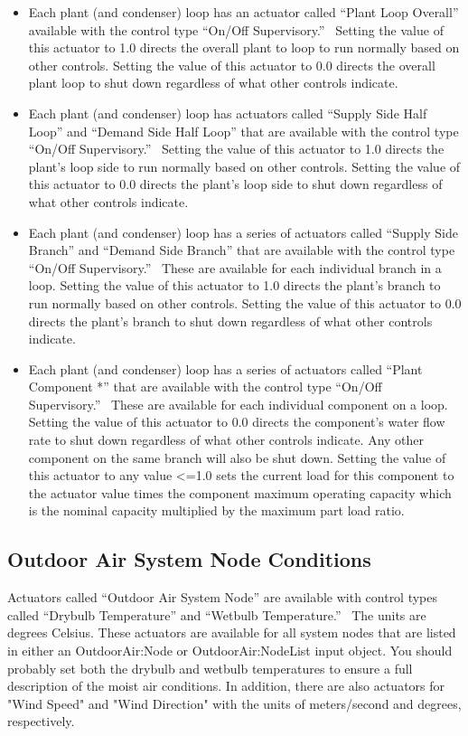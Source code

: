 \begin{itemize}
\item
  Each plant (and condenser) loop has an actuator called ``Plant Loop Overall'' available with the control type ``On/Off Supervisory.''~ Setting the value of this actuator to 1.0 directs the overall plant to loop to run normally based on other controls. Setting the value of this actuator to 0.0 directs the overall plant loop to shut down regardless of what other controls indicate.
\item
  Each plant (and condenser) loop has actuators called ``Supply Side Half Loop'' and ``Demand Side Half Loop'' that are available with the control type ``On/Off Supervisory.''~ Setting the value of this actuator to 1.0 directs the plant's loop side to run normally based on other controls. Setting the value of this actuator to 0.0 directs the plant's loop side to shut down regardless of what other controls indicate.
\item
  Each plant (and condenser) loop has a series of actuators called ``Supply Side Branch'' and ``Demand Side Branch'' that are available with the control type ``On/Off Supervisory.''~ These are available for each individual branch in a loop. Setting the value of this actuator to 1.0 directs the plant's branch to run normally based on other controls. Setting the value of this actuator to 0.0 directs the plant's branch to shut down regardless of what other controls indicate.
\item
  Each plant (and condenser) loop has a series of actuators called ``Plant Component *'' that are available with the control type ``On/Off Supervisory.''~ These are available for each individual component on a loop. Setting the value of this actuator to 0.0 directs the component's water flow rate to shut down regardless of what other controls indicate. Any other component on the same branch will also be shut down. Setting the value of this actuator to any value <=1.0 sets the current load for this component to the actuator value times the component maximum operating capacity which is the nominal capacity multiplied by the maximum part load ratio.
\end{itemize}

\subsection{Outdoor Air System Node Conditions}\label{outdoor-air-system-node-conditions}

Actuators called ``Outdoor Air System Node'' are available with control types called ``Drybulb Temperature'' and ``Wetbulb Temperature.''~ The units are degrees Celsius. These actuators are available for all system nodes that are listed in either an OutdoorAir:Node or OutdoorAir:NodeList input object. You should probably set both the drybulb and wetbulb temperatures to ensure a full description of the moist air conditions.  In addition, there are also actuators for "Wind Speed" and "Wind Direction" with the units of meters/second and degrees, respectively.

